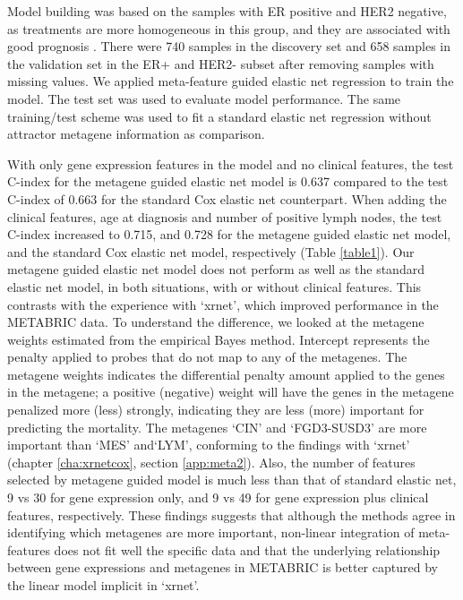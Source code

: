 Model building was based on the samples with ER positive and HER2 negative, as treatments are more homogeneous in this group, and they are associated with good prognosis \citep{rivenbark2013molecular}. There were 740 samples in the discovery set and 658 samples in the validation set in the ER+ and HER2- subset after removing samples with missing values. We applied meta-feature guided elastic net regression to train the model. The test set was used to evaluate model performance. The same training/test scheme was used to fit a standard elastic net regression without attractor metagene information as comparison. 

With only gene expression features in the model and no clinical features, the test C-index for the metagene guided elastic net model is 0.637 compared to the test C-index of 0.663 for the standard Cox elastic net counterpart. When adding the clinical features, age at diagnosis and number of positive lymph nodes, the test C-index increased to 0.715, and 0.728 for the metagene guided elastic net model, and the standard Cox elastic net model, respectively (Table \ref{table1}). Our metagene guided elastic net model does not perform as well as the standard elastic net model, in both situations, with or without clinical features. This contrasts with the experience with `xrnet', which improved performance in the METABRIC data. To understand the difference, we looked at the metagene weights estimated from the empirical Bayes method. Intercept represents the penalty applied to probes that do not map to any of the metagenes. The metagene weights indicates the differential penalty amount applied to the genes in the metagene; a positive (negative) weight will have the genes in the metagene penalized more (less) strongly, indicating they are less (more) important for predicting the mortality. The metagenes `CIN' and `FGD3-SUSD3' are more important than `MES' and`LYM', conforming to the findings with `xrnet' (chapter \ref{cha:xrnetcox}, section \ref{app:meta2}). Also, the number of features selected by metagene guided model is much less than that of standard elastic net, 9 vs 30 for gene expression only, and 9 vs 49 for gene expression plus clinical features, respectively. These findings suggests that although the methods agree in identifying which  metagenes are more important, non-linear integration of meta-features does not fit well the specific data and that the underlying relationship between gene expressions and metagenes in METABRIC is better captured by the linear model implicit in `xrnet'.  

